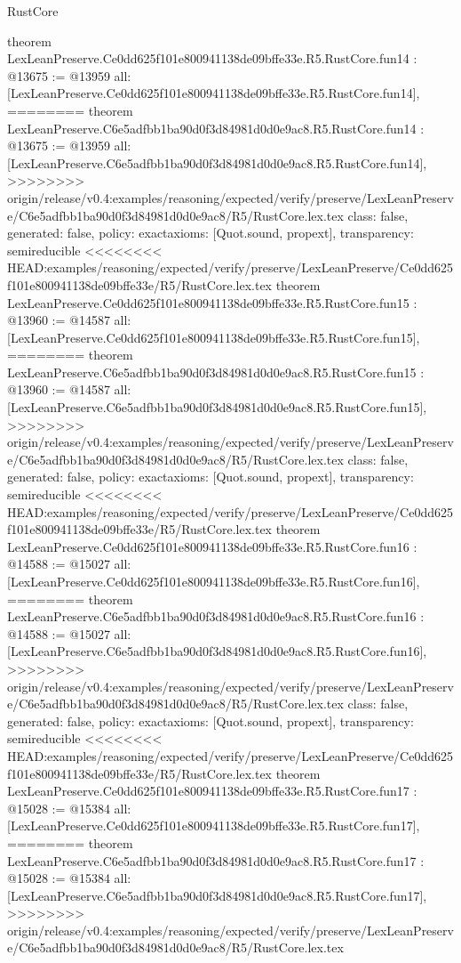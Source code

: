 \begin{lexlean}{RustCore}
\begin{coremodule}
{\begin{coremodule}
{{{{{{{{{{{{{{{{theorem LexLeanPreserve.Ce0dd625f101e800941138de09bffe33e.R5.RustCore.fun14 : @13675 := @13959 {
  all: [LexLeanPreserve.Ce0dd625f101e800941138de09bffe33e.R5.RustCore.fun14],
========
theorem LexLeanPreserve.C6e5adfbb1ba90d0f3d84981d0d0e9ac8.R5.RustCore.fun14 : @13675 := @13959 {
  all: [LexLeanPreserve.C6e5adfbb1ba90d0f3d84981d0d0e9ac8.R5.RustCore.fun14],
>>>>>>>> origin/release/v0.4:examples/reasoning/expected/verify/preserve/LexLeanPreserve/C6e5adfbb1ba90d0f3d84981d0d0e9ac8/R5/RustCore.lex.tex
  class: false,
  generated: false,
  policy: exact{axioms: [Quot.sound, propext]},
  transparency: semireducible
}
<<<<<<<< HEAD:examples/reasoning/expected/verify/preserve/LexLeanPreserve/Ce0dd625f101e800941138de09bffe33e/R5/RustCore.lex.tex
theorem LexLeanPreserve.Ce0dd625f101e800941138de09bffe33e.R5.RustCore.fun15 : @13960 := @14587 {
  all: [LexLeanPreserve.Ce0dd625f101e800941138de09bffe33e.R5.RustCore.fun15],
========
theorem LexLeanPreserve.C6e5adfbb1ba90d0f3d84981d0d0e9ac8.R5.RustCore.fun15 : @13960 := @14587 {
  all: [LexLeanPreserve.C6e5adfbb1ba90d0f3d84981d0d0e9ac8.R5.RustCore.fun15],
>>>>>>>> origin/release/v0.4:examples/reasoning/expected/verify/preserve/LexLeanPreserve/C6e5adfbb1ba90d0f3d84981d0d0e9ac8/R5/RustCore.lex.tex
  class: false,
  generated: false,
  policy: exact{axioms: [Quot.sound, propext]},
  transparency: semireducible
}
<<<<<<<< HEAD:examples/reasoning/expected/verify/preserve/LexLeanPreserve/Ce0dd625f101e800941138de09bffe33e/R5/RustCore.lex.tex
theorem LexLeanPreserve.Ce0dd625f101e800941138de09bffe33e.R5.RustCore.fun16 : @14588 := @15027 {
  all: [LexLeanPreserve.Ce0dd625f101e800941138de09bffe33e.R5.RustCore.fun16],
========
theorem LexLeanPreserve.C6e5adfbb1ba90d0f3d84981d0d0e9ac8.R5.RustCore.fun16 : @14588 := @15027 {
  all: [LexLeanPreserve.C6e5adfbb1ba90d0f3d84981d0d0e9ac8.R5.RustCore.fun16],
>>>>>>>> origin/release/v0.4:examples/reasoning/expected/verify/preserve/LexLeanPreserve/C6e5adfbb1ba90d0f3d84981d0d0e9ac8/R5/RustCore.lex.tex
  class: false,
  generated: false,
  policy: exact{axioms: [Quot.sound, propext]},
  transparency: semireducible
}
<<<<<<<< HEAD:examples/reasoning/expected/verify/preserve/LexLeanPreserve/Ce0dd625f101e800941138de09bffe33e/R5/RustCore.lex.tex
theorem LexLeanPreserve.Ce0dd625f101e800941138de09bffe33e.R5.RustCore.fun17 : @15028 := @15384 {
  all: [LexLeanPreserve.Ce0dd625f101e800941138de09bffe33e.R5.RustCore.fun17],
========
theorem LexLeanPreserve.C6e5adfbb1ba90d0f3d84981d0d0e9ac8.R5.RustCore.fun17 : @15028 := @15384 {
  all: [LexLeanPreserve.C6e5adfbb1ba90d0f3d84981d0d0e9ac8.R5.RustCore.fun17],
>>>>>>>> origin/release/v0.4:examples/reasoning/expected/verify/preserve/LexLeanPreserve/C6e5adfbb1ba90d0f3d84981d0d0e9ac8/R5/RustCore.lex.tex
}}}}}}}}}}}}}}}}}}}}}
\end{coremodule}}
\end{coremodule}
\end{lexlean}
